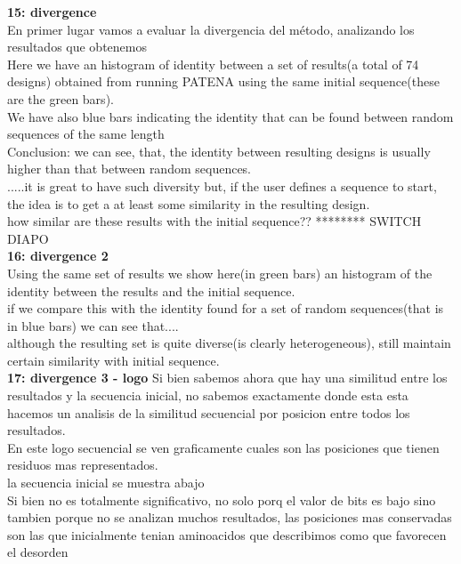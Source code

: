 \documentclass[a4paper,10pt]{article}
\begin{document}
\textbf{15: divergence}\\
En primer lugar vamos a evaluar la divergencia del método, analizando los resultados que obtenemos\\
Here we have an histogram of identity between a set of results(a total of 74 designs) obtained from running PATENA using the same initial sequence(these are the green bars).\\
We have also blue bars indicating the identity that can be found between random sequences of the same length\\
Conclusion: we can see, that, the identity between resulting designs is usually higher than that between random sequences.\\
.....it is great to have such diversity but, if the user defines a sequence to start, the idea is to get a at least some similarity in the resulting design. \\
how similar are these results with the initial sequence??  ******** SWITCH DIAPO\\


\textbf{16: divergence 2}\\
Using the same set of results we show here(in green bars) an histogram of the identity between the results and the initial sequence.\\
if we compare this with the identity found for a set of random sequences(that is in blue bars) we can see that....\\
although the resulting set is quite diverse(is clearly heterogeneous), still maintain certain similarity with initial sequence.\\



\textbf{17: divergence 3 - logo}
Si bien sabemos ahora que hay una similitud entre los resultados y la secuencia inicial, no sabemos exactamente donde esta esta\\
hacemos un analisis de la similitud secuencial por posicion entre todos los resultados.\\
En este logo secuencial se ven graficamente cuales son las posiciones que tienen residuos mas representados.\\
la secuencia inicial se muestra abajo\\
Si bien no es totalmente significativo, no solo porq el valor de bits es bajo sino tambien porque no se analizan muchos resultados, 
las posiciones mas conservadas son las que inicialmente tenian aminoacidos que describimos como que favorecen el desorden
\end{document}
